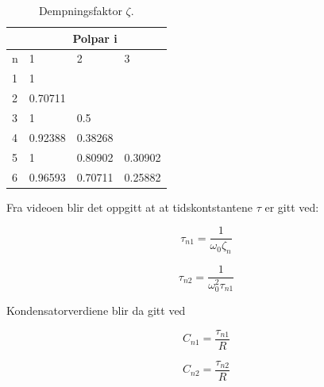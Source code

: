 \begin{table}[!hbt]
	\caption{Dempningsfaktor $\zeta$.}
	\centering
	\begin{tabular}{|l|lll|}
	\hline
	\multicolumn{1}{|c|}{} & \multicolumn{3}{c|}{Polpar i}                                         \\ \hline
	n                      & \multicolumn{1}{l|}{1}       & \multicolumn{1}{l|}{2}       & 3       \\ \hline
	1                      & \multicolumn{1}{l|}{1}       & \multicolumn{1}{l|}{}        &         \\ \hline
	2                      & \multicolumn{1}{l|}{0.70711} & \multicolumn{1}{l|}{}        &         \\ \hline
	3                      & \multicolumn{1}{l|}{1}       & \multicolumn{1}{l|}{0.5}     &         \\ \hline
	4                      & \multicolumn{1}{l|}{0.92388} & \multicolumn{1}{l|}{0.38268} &         \\ \hline
	5                      & \multicolumn{1}{l|}{1}       & \multicolumn{1}{l|}{0.80902} & 0.30902 \\ \hline
	6                      & \multicolumn{1}{l|}{0.96593} & \multicolumn{1}{l|}{0.70711} & 0.25882 \\ \hline
	\end{tabular}
	\label{tab:polpar}
	\end{table}

Fra videoen \cite{lundheim_2022_et} blir det oppgitt at at tidskontstantene $\tau$ er gitt ved:

\noindent\begin{minipage}{.5\linewidth}
	\begin{equation}
		\tau_{n1}=\frac{1}{\omega_0 \zeta_n} 
	\end{equation}
	\end{minipage}%
	\begin{minipage}{.5\linewidth}
	\begin{equation}
		\tau_{n2}=\frac{1}{\omega_0^2 \tau_{n1}}
	\end{equation}
	\label{eq:tau}
	\end{minipage}

Kondensatorverdiene blir da gitt ved

\noindent\begin{minipage}{.5\linewidth}
	\begin{equation}
		C_{n1}= \frac{\tau_{n1}}{R} 
	\end{equation}
	\end{minipage}%
	\begin{minipage}{.5\linewidth}
	\begin{equation}
		C_{n2}= \frac{\tau_{n2}}{R} 
	\end{equation}
	\label{eq:capacitor}
	\end{minipage}